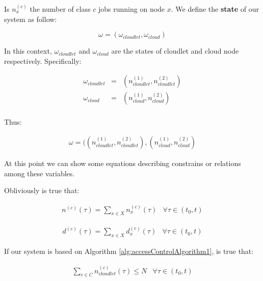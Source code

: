 \documentclass[10pt,a4paper]{article}
\begin{document}
Is $n_x^{(c)}$ the number of class $c$ jobs running on node $x$. We define the \textbf{state} of our system as follow:

\begin{equation}
\omega = (\omega_{cloudlet},\omega_{cloud})
\end{equation}

In this context, $\omega_{cloudlet}$ and $\omega_{cloud}$ are the states of cloudlet and cloud node respectively. Specifically:

\begin{equation}
\begin{array} {rcl} 
\omega_{cloudlet} & = & (n_{cloudlet}^{(1)},n_{cloudlet}^{(2)}) \\
\omega_{cloud} & = & (n_{cloud}^{(1)},n_{cloud}^{(2)}) \\
\end{array}
\end{equation}

Thus:

\begin{equation}
\begin{array} {rcl} 
\omega = ((n_{cloudlet}^{(1)},n_{cloudlet}^{(2)}),(n_{cloud}^{(1)},n_{cloud}^{(2)})
\end{array}
\end{equation}

At this point we can show some equations describing constrains or relations among these variables.

Obliviously is true that:

\begin{equation}
\begin{array} {lr} 
\displaystyle n^{(c)}(\tau) = \sum_{x \in X} n_x^{(c)}(\tau) & \forall \tau \in (t_0, t)
\end{array}
\end{equation}

\begin{equation}
\begin{array} {lr} 
\displaystyle d^{(c)}(\tau) = \sum_{x \in X} d_x^{(c)}(\tau) & \forall \tau \in (t_0, t)
\end{array}
\end{equation}

If our system is based on Algorithm \ref{alg:accessControlAlgorithm1}, is true that:

\begin{equation}
\begin{array} {lr} 
\displaystyle \sum_{c \in C} n_{cloudlet}^{(c)}(\tau) \leq N & \forall \tau \in (t_0, t)
\end{array}
\end{equation}
\end{document}
